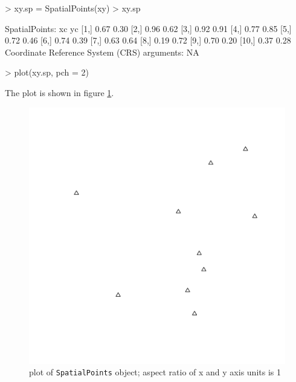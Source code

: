 \documentclass{article}
\begin{document}
\begin{Schunk}
\begin{Sinput}
> xy.sp = SpatialPoints(xy)
> xy.sp
\end{Sinput}
\begin{Soutput}
SpatialPoints:
        xc   yc
 [1,] 0.67 0.30
 [2,] 0.96 0.62
 [3,] 0.92 0.91
 [4,] 0.77 0.85
 [5,] 0.72 0.46
 [6,] 0.74 0.39
 [7,] 0.63 0.64
 [8,] 0.19 0.72
 [9,] 0.70 0.20
[10,] 0.37 0.28
Coordinate Reference System (CRS) arguments: NA 
\end{Soutput}
\begin{Sinput}
> plot(xy.sp, pch = 2)
\end{Sinput}
\end{Schunk}
The plot is shown in figure \ref{fig:points}.

\begin{figure}
\begin{center}
\includegraphics{sp-005}
\end{center}
\caption{plot of {\tt SpatialPoints} object; aspect ratio of x and y axis units is 1}
\label{fig:points}
\end{figure}
\end{document}
